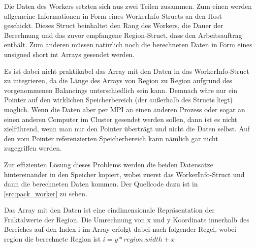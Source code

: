 Die Daten des Workers setzten sich aus zwei Teilen zusammen. Zum einen werden allgemeine Informationen in Form eines WorkerInfo-Structs an den Host geschickt. Dieses Struct beinhaltet den Rang des Workers, die Dauer der Berechnung und das zuvor empfangene Region-Struct, dass den Arbeitsauftrag enthält. Zum anderen müssen natürlich noch die berechneten Daten in Form eines unsigned short int Arrays gesendet werden.

Es ist dabei nicht praktikabel das Array mit den Daten in das WorkerInfo-Struct zu integrieren, da die Länge des Arrays von Region zu Region aufgrund des vorgenommenen Balancings unterschiedlich sein kann. Demnach wäre nur ein Pointer auf den wirklichen Speicherbereich (der außerhalb des Structs liegt) möglich. Wenn die Daten aber per MPI an einen anderen Prozess oder sogar an einen anderen Computer im Cluster gesendet werden sollen, dann ist es nicht zielführend, wenn man nur den Pointer überträgt und nicht die Daten selbst. Auf den vom Pointer referenzierten Speicherbereich kann nämlich gar nicht zugegriffen werden.


Zur effizienten Lösung dieses Problems werden die beiden Datensätze hintereinander in den Speicher kopiert, wobei zuerst das WorkerInfo-Struct und dann die berechneten Daten kommen. Der Quellcode dazu ist in \autoref{src:pack_worker} zu sehen.

Das Array mit den Daten ist eine eindimensionale Repräsentation der Fraktalwerte der Region. Die Umrechnung von x und y Koordinate innerhalb des Bereiches auf den Index i im Array erfolgt dabei nach folgender Regel, wobei region die berechnete Region ist \quad $i = y * region.width + x$

\begin{figure}[h!]
	
\end{figure}

